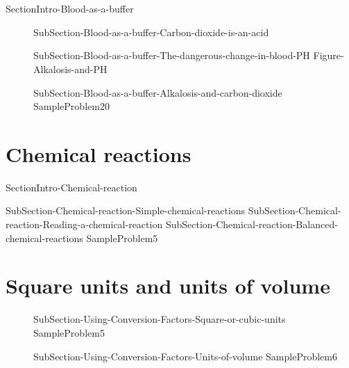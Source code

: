 \documentclass[main.tex]{subfiles}
\newcommand\chapterlabel{ChMIX-biomoleculesinsolution}\setcounter{figurenewcounter}{0}\setcounter{tablenewcounter}{0}\setcounter{formulanewcounter}{0}
\begin{document}
\renewcommand\chapterlabel{Ch-acidbase}

\section{\color{blue!30!black}{\faFlask Blood as a buffer}}{SectionIntro-Blood-as-a-buffer}
\sloppy
\begin{description}
\item[] {SubSection-Blood-as-a-buffer-Carbon-dioxide-is-an-acid}
\item[] 
{SubSection-Blood-as-a-buffer-The-dangerous-change-in-blood-PH}
  {Figure-Alkalosis-and-PH}
\item[] 
{SubSection-Blood-as-a-buffer-Alkalosis-and-carbon-dioxide}
   {SampleProblem20}
 \end{description}

\renewcommand\chapterlabel{Ch-mole}
\section{\faFire Chemical reactions}
{SectionIntro-Chemical-reaction}
\sloppy\begin{description}
{SubSection-Chemical-reaction-Simple-chemical-reactions}
{SubSection-Chemical-reaction-Reading-a-chemical-reaction}
{SubSection-Chemical-reaction-Balanced-chemical-reactions}
{SampleProblem5}
\end{description}

\renewcommand\chapterlabel{Ch-measurements}
\section{\faGears Square units and units of volume}
\sloppy\begin{description}
\item[]{SubSection-Using-Conversion-Factors-Square-or-cubic-units}
{SampleProblem5}
\item[]{SubSection-Using-Conversion-Factors-Units-of-volume}
{SampleProblem6}
\end{description}

 
\end{document}
